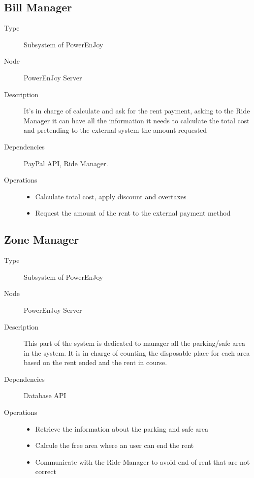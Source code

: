 \subsection{Bill Manager}
\begin{description}
	\item[Type] Subsystem of PowerEnJoy
	\item[Node] PowerEnJoy Server
	\item[Description] It's in charge of calculate and ask for the rent payment, asking to the Ride Manager it can have all the information it needs to calculate the total cost and pretending to the external system the amount requested
	\item[Dependencies] PayPal API, Ride Manager.
	\item[Operations] 
		\begin{itemize}
			\item Calculate total cost, apply discount and overtaxes 
			\item Request the amount of the rent to the external payment method 
		\end{itemize}
\end{description}

\subsection{Zone Manager}
\begin{description}
	\item[Type] Subsystem of PowerEnJoy
	\item[Node] PowerEnJoy Server
	\item[Description] This part of the system is dedicated to manager all the parking/safe area in the system. It is in charge of counting the disposable place for each area based on the rent ended and the rent in course. 
	\item[Dependencies] Database API
	\item[Operations] 
		\begin{itemize}
			\item Retrieve the information about the parking and safe area
			\item Calcule the free area where an user can end the rent 
			\item Communicate with the Ride Manager to avoid end of rent that are not correct
	\end{itemize}
\end{description}

